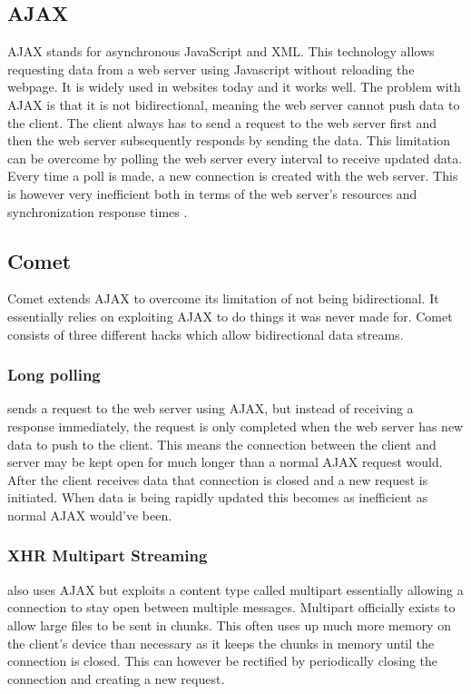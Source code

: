 \documentclass[prodmode,acmtecs]{acmsmall}
\begin{document}
\subsection{AJAX} 
AJAX stands for asynchronous JavaScript and XML. This technology allows requesting data from a web server using Javascript without reloading the webpage. It is widely used in websites today and it works well. The problem with AJAX is that it is not bidirectional, meaning the web server cannot push data to the client. The client always has to send a request to the web server first and then the web server subsequently responds by sending the data. This limitation can be overcome by polling the web server every interval to receive updated data. Every time a poll is made, a new connection is created with the web server. This is however very inefficient both in terms of the web server's resources and synchronization response times \cite{gutwin2011real}. 

\subsection{Comet}
Comet extends AJAX to overcome its limitation of not being bidirectional. It essentially relies on exploiting AJAX to do things it was never made for. Comet consists of three different hacks which allow bidirectional data streams. \\
\subsubsection{Long polling} sends a request to the web server using AJAX, but instead of receiving a response immediately, the request is only completed when the web server has new data to push to the client. This means the connection between the client and server may be kept open for much longer than a normal AJAX request would. After the client receives data that connection is closed and a new request is initiated. When data is being rapidly updated this becomes as inefficient as normal AJAX would've been.\\
\subsubsection{XHR Multipart Streaming} also uses AJAX but exploits a content type called multipart essentially allowing a connection to stay open between multiple messages. Multipart officially exists to allow large files to be sent in chunks. This often uses up much more memory on the client's device than necessary as it keeps the chunks in memory until the connection is closed. This can however be rectified by periodically closing the connection and creating a new request.\\
\end{document}
